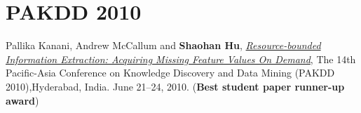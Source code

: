 \section{\sc PAKDD 2010}\hypertarget{kanani2010pakdd}{} Pallika Kanani, Andrew McCallum and \textbf{Shaohan Hu}, \href{http://www.springerlink.com/content/j41w758434321108}{\emph{Resource-bounded Information Extraction: Acquiring Missing Feature Values On Demand}}, \textsf{The 14th Pacific-Asia Conference on Knowledge Discovery and Data Mining (PAKDD 2010)},Hyderabad, India. June 21--24, 2010. (\textbf{Best student paper runner-up award})
